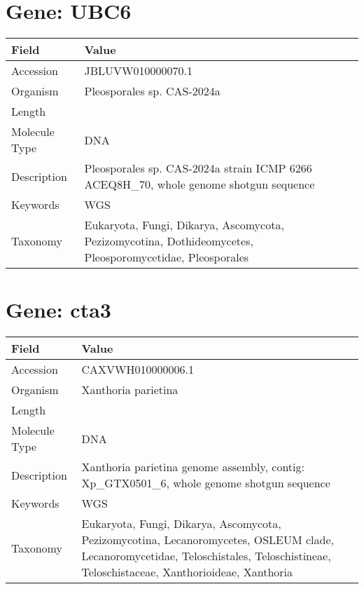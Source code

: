\documentclass[10pt]{article}
\begin{document}
\section*{Gene: UBC6}
{\footnotesize
\begin{longtable}{>{\raggedright\arraybackslash}p{4.5cm} >{\raggedright\arraybackslash}p{11.5cm}}
\textbf{Field} & \textbf{Value} \\
\hline
Accession & JBLUVW010000070.1 \\
Organism & Pleosporales sp. CAS-2024a \\
Length & 129236 \\
Molecule Type & DNA \\
Description & Pleosporales sp. CAS-2024a strain ICMP 6266 ACEQ8H\_70, whole genome shotgun sequence \\
Keywords & WGS \\
Taxonomy & Eukaryota, Fungi, Dikarya, Ascomycota, Pezizomycotina, Dothideomycetes, Pleosporomycetidae, Pleosporales \\
\end{longtable}
}


\section*{Gene: cta3}
{\footnotesize
\begin{longtable}{>{\raggedright\arraybackslash}p{4.5cm} >{\raggedright\arraybackslash}p{11.5cm}}
\textbf{Field} & \textbf{Value} \\
\hline
Accession & CAXVWH010000006.1 \\
Organism & Xanthoria parietina \\
Length & 1643995 \\
Molecule Type & DNA \\
Description & Xanthoria parietina genome assembly, contig: Xp\_GTX0501\_6, whole genome shotgun sequence \\
Keywords & WGS \\
Taxonomy & Eukaryota, Fungi, Dikarya, Ascomycota, Pezizomycotina, Lecanoromycetes, OSLEUM clade, Lecanoromycetidae, Teloschistales, Teloschistineae, Teloschistaceae, Xanthorioideae, Xanthoria \\
\end{longtable}
}
\end{document}
